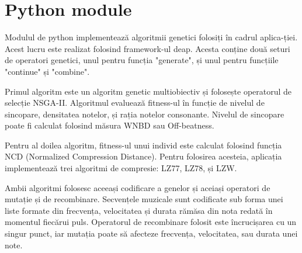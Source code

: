 \documentclass[11pt]{article}
\begin{document}
\section{Python module}
Modulul de python implementează algoritmii genetici folosiți în cadrul aplica-ției. Acest lucru este realizat folosind framework-ul deap. Acesta conține două seturi de operatori genetici, unul pentru funcția "generate", și unul pentru funcțiile "continue" și "combine". \par 
Primul algoritm este un algoritm genetic multiobiectiv și folosește operatorul de selecție NSGA-II. Algoritmul evaluează fitness-ul în funcție de nivelul de sincopare, densitatea notelor, și rația notelor consonante. Nivelul de sincopare poate fi calculat folosind măsura WNBD sau Off-beatness. \par
Pentru al doilea algoritm, fitness-ul unui individ este calculat folosind funcția NCD (Normalized Compression Distance). Pentru folosirea acesteia, aplicația implementează trei algoritmi de compresie: LZ77, LZ78, și LZW. \par
Ambii algoritmi folosesc aceeași codificare a genelor și aceiași operatori de mutație și de recombinare. Secvențele muzicale sunt codificate sub forma unei liste formate din frecvența, velocitatea și durata rămăsa din nota redată în momentul fiecărui puls. Operatorul de recombinare folosit este încrucișarea cu un singur punct, iar mutația poate să afecteze frecvența, velocitatea, sau durata unei note.
\label{module}
\end{document}

